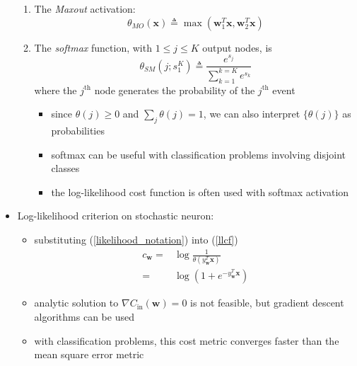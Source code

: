\documentclass[onecolumn]{IEEEtran}
\newcommand{\beq}{\begin{equation}}
\newcommand{\eeq}{\end{equation}}
\newcommand{\bi}{\begin{itemize}}
\newcommand{\ei}{\end{itemize}}
\begin{document}
\begin{itemize}
\begin{enumerate}
        \item The \emph{Maxout} activation:
        \beq
            \theta_{MO}(\bm{x}) \triangleq \max (\bm{w}_1^T \bm{x},\bm{w}_2^T \bm{x})
        \eeq
        \item The \emph{softmax} function, with $1 \leq j \leq K$ output nodes, is
        \beq\label{softmax_def}
            \theta_{SM}(j; s_1^K) \triangleq \frac{e^{s_j}}{\sum_{k=1}^{k=K} e^{s_k}}
        \eeq
        where the $j^\text{th}$ node generates the probability of the $j^\text{th}$ event
        \bi
            \item since $\theta(j) \geq 0$ and $\sum_j \theta(j)=1$, we can also interpret $\{ \theta(j)\}$ as probabilities
            \item softmax can be useful with classification problems involving disjoint classes
            \item the log-likelihood cost function is often used with softmax activation
        \ei
    \end{enumerate}
    \item Log-likelihood criterion on stochastic neuron:
    \bi
        \item substituting (\ref{likelihood_notation}) into (\ref{llcf})
        \beq\label{lr_cf}\begin{split}
           c_{\bm{w}}=&  \log  \frac{1}{\theta(y_{\bm{w}}^T \bm{x})}\\
           = & \log (1+e^{-y_{\bm{w}}^T \bm{x}})
        \end{split}\eeq
        \item analytic solution to $\nabla C_\text{in}(\bm{w})=0$ is not feasible, but gradient descent algorithms can be used
        \item with classification problems, this cost metric converges faster than the mean square error metric
    \ei
\end{itemize}
\end{document}
